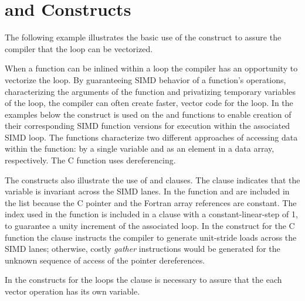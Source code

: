\section{ and   Constructs}
\label{sec:SIMD}

The following example illustrates the basic use of the  construct 
to assure the compiler that the loop can be vectorized.


 

When a function can be inlined within a loop the compiler has an opportunity to 
vectorize the loop. By guaranteeing SIMD behavior of a function's operations, 
characterizing the arguments of the function and privatizing temporary 
variables of the loop, the compiler can often create faster, vector code for 
the loop. In the examples below the   construct is 
used on the  and  functions to enable creation of their 
corresponding SIMD function versions for execution within the associated SIMD 
loop. The functions characterize two different approaches of accessing data 
within the function: by a single variable and as an element in a data array, 
respectively. The  C function uses dereferencing.

The   constructs also illustrate the use of 
 and  clauses.  The  clause 
indicates that the variable  is invariant across the SIMD lanes. In 
the  function  and  are included in the  
list because the C pointer and the Fortran array references are constant.  The 
 index used in the  function is included in a  
clause with a constant-linear-step of 1, to guarantee a unity increment of the 
associated loop. In the   construct for the  
C function the   clause instructs the compiler to generate 
unit-stride loads across the SIMD lanes; otherwise,  costly \emph{gather} 
instructions would be generated for the unknown sequence of access of the 
pointer dereferences.

In the  constructs for the loops the  clause is 
necessary to assure that the each vector operation has its own  
variable.





